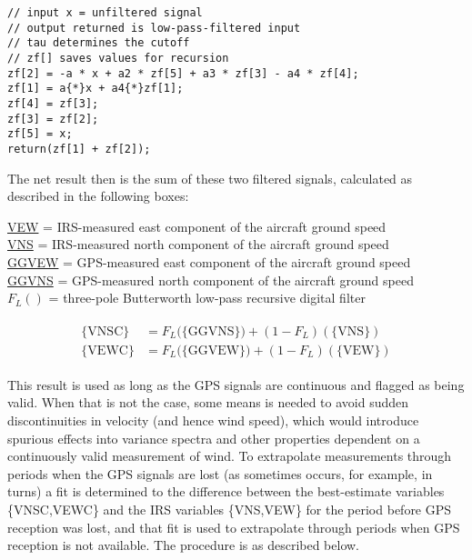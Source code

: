 \documentclass[
]{book}
\begin{document}
\begin{verbatim}
// input x = unfiltered signal  
// output returned is low-pass-filtered input  
// tau determines the cutoff  
// zf[] saves values for recursion  
zf[2] = -a * x + a2 * zf[5] + a3 * zf[3] - a4 * zf[4];  
zf[1] = a{*}x + a4{*}zf[1];     
zf[4] = zf[3];  
zf[3] = zf[2];  
zf[5] = x;  
return(zf[1] + zf[2]); 
\end{verbatim}

The net result then is the sum of these two filtered signals, calculated as described in the following boxes:

\protect\hyperlink{vew}{VEW} = IRS-measured east component
of the aircraft ground speed\\
\protect\hyperlink{vns}{VNS} = IRS-measured north component of the aircraft ground speed\\
\protect\hyperlink{ggvew}{GGVEW} = GPS-measured east component of the aircraft ground speed\\
\protect\hyperlink{ggvns}{GGVNS} = GPS-measured north component of the aircraft ground speed\\
\(F_{L}()\) = three-pole Butterworth low-pass recursive digital filter

\begin{align}\begin{split}
\{\mathrm{VNSC}\} & = F_{L}(\mathrm{\{GGVNS\})}+(1-F_{L})(\{\mathrm{VNS\}})\\
\{\mathrm{VEWC}\} & = F_{L}(\mathrm{\{GGVEW\})}+(1-F_{L})(\{\mathrm{VEW\}})
\end{split}\label{eq:VC}
\end{align}

This result is used as long as the GPS signals are continuous and flagged as being valid. When that is not the case, some means is needed to avoid sudden discontinuities in velocity (and hence wind speed), which would introduce spurious effects into variance spectra and other properties dependent on a continuously valid measurement of wind. To extrapolate measurements through periods when the GPS signals are lost (as sometimes occurs, for example, in turns) a fit is determined to the difference between the best-estimate variables \{VNSC,VEWC\} and the IRS variables \{VNS,VEW\} for the period before GPS reception was lost, and that fit is used to extrapolate through periods when GPS reception is not available. The procedure is as described below.
\end{document}
